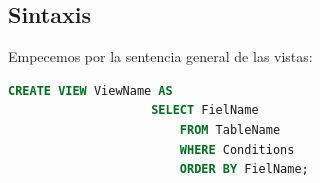 \documentclass[12pt, fleqn]{report}                             %
\begin{document}
        \subsection{Sintaxis}

            Empecemos por la sentencia general de las vistas:

            \begin{lstlisting}[language=SQL, gobble=16]
                CREATE VIEW ViewName AS
                    SELECT FielName
                        FROM TableName
                        WHERE Conditions
                        ORDER BY FielName; 
            \end{lstlisting}
\end{document}
